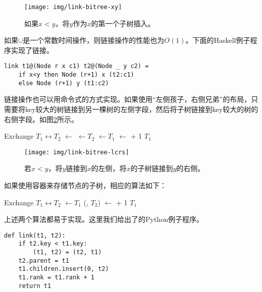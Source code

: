 \documentclass{ctexart}
\begin{document}
\begin{figure}[htbp]
  \centering
  \texttt{[image: img/link-bitree-xy]}
  \caption{如果$x < y$，将$y$作为$x$的第一个子树插入。} \label{fig:link-xy}
\end{figure}

如果$\cup$是一个常数时间操作，则链接操作的性能也为$O(1)$。下面的Haskell例子程序实现了链接。

\lstset{language=Haskell}
\begin{lstlisting}[style=Haskell]
link t1@(Node r x c1) t2@(Node _ y c2) =
    if x<y then Node (r+1) x (t2:c1)
    else Node (r+1) y (t1:c2)
\end{lstlisting}

链接操作也可以用命令式的方式实现。如果使用“左侧孩子，右侧兄弟”的布局，只需要将key较大的树链接到另一棵树的左侧字段，然后将子树链接到key较大的树的右侧字段。如图\ref{fig:link-lcrs}所示。

\begin{algorithmic}[1]
    \State Exchange $T_1 \leftrightarrow T_2$
  \EndIf
  \State {} $\gets$ 
  \State {} $\gets T_2$
  \State {} $\gets T_1$
  \State {} $\gets$  + 1
  \State \Return $T_1$
\EndFunction
\end{algorithmic}

\begin{figure}[htbp]
  \centering
  \texttt{[image: img/link-bitree-lcrs]}
  \caption{若$x < y$，将$y$链接到$x$的左侧，将$x$的子树链接到$y$的右侧。} \label{fig:link-lcrs}
\end{figure}

如果使用容器来存储节点的子树，相应的算法如下：

\begin{algorithmic}[1]
    \State Exchange $T_1 \leftrightarrow T_2$
  \EndIf
  \State {} $\gets T_1$
  \State {}(, $T_2$)
  \State {} $\gets$  + 1
  \State \Return $T_1$
\EndFunction
\end{algorithmic}

上述两个算法都易于实现。这里我们给出了的Python例子程序。

\lstset{language=Python}
\begin{lstlisting}
def link(t1, t2):
    if t2.key < t1.key:
        (t1, t2) = (t2, t1)
    t2.parent = t1
    t1.children.insert(0, t2)
    t1.rank = t1.rank + 1
    return t1
\end{lstlisting}
\end{document}
